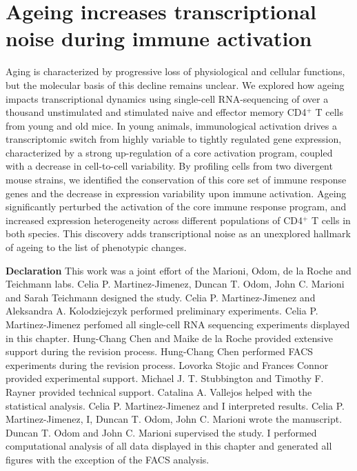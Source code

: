 
\chapter{Ageing increases transcriptional noise during immune activation}  

\graphicspath{{Chapter1/Figures/}}

\begin{Abstract}
Aging is characterized by progressive loss of physiological and cellular functions, but the molecular basis of this decline remains unclear. We explored how ageing impacts transcriptional dynamics using single-cell RNA-sequencing of over a thousand unstimulated and stimulated naive and effector memory CD4$^+$ T cells from young and old mice. In young animals, immunological activation drives a transcriptomic switch from highly variable to tightly regulated gene expression, characterized by a strong up-regulation of a core activation program, coupled with a decrease in cell-to-cell variability. By profiling cells from two divergent mouse strains, we identified the conservation of this core set of immune response genes and the decrease in expression variability upon immune activation. Ageing significantly perturbed the activation of the core immune response program, and increased expression heterogeneity across different populations of CD4$^+$ T cells in both species. This discovery adds transcriptional noise as an unexplored hallmark of ageing to the list of phenotypic changes.
\end{Abstract}

\newpage

\begin{Comment}
\textbf{Declaration} This work was a joint effort of the Marioni, Odom, de la Roche and Teichmann labs. Celia P. Martinez-Jimenez, Duncan T. Odom, John C. Marioni and Sarah Teichmann designed the study. Celia P. Martinez-Jimenez and Aleksandra A. Kolodziejczyk performed preliminary experiments. Celia P. Martinez-Jimenez perfomed all single-cell RNA sequencing experiments displayed in this chapter. Hung-Chang Chen and Maike de la Roche provided extensive support during the revision process. Hung-Chang Chen performed FACS experiments during the revision process. Lovorka Stojic and Frances Connor provided experimental support. Michael J. T. Stubbington and Timothy F. Rayner provided technical support. Catalina A. Vallejos helped with the statistical analysis. Celia P. Martinez-Jimenez and I interpreted results. Celia P. Martinez-Jimenez, I, Duncan T. Odom, John C. Marioni wrote the manuscript. Duncan T. Odom and John C. Marioni supervised the study. I performed computational analysis of all data displayed in this chapter and generated all figures with the exception of the FACS analysis. 
\end{Comment}

